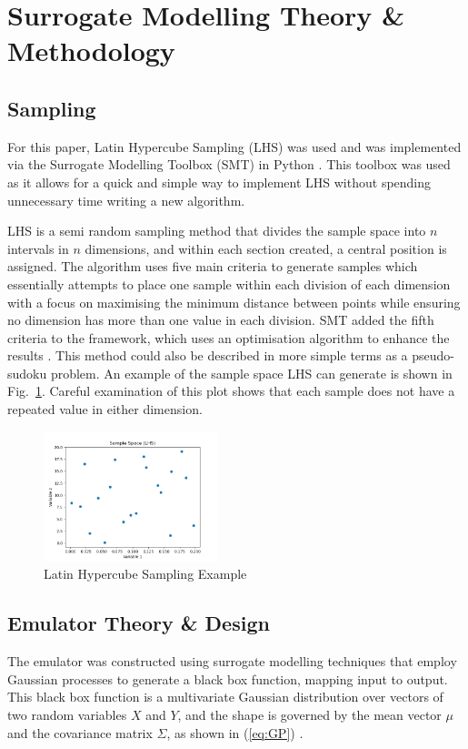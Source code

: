 \documentclass[conference]{IEEEtran}
\begin{document}
\section{Surrogate Modelling Theory \& Methodology}
\subsection{Sampling}

For this paper, Latin Hypercube Sampling (LHS) was used and was implemented via the Surrogate Modelling Toolbox (SMT) in Python \cite{saves_smt_2024}. This toolbox was used as it allows for a quick and simple way to implement LHS without spending unnecessary time writing a new algorithm.

LHS is a semi random sampling method that divides the sample space into $n$ intervals in $n$ dimensions, and within each section created, a central position is assigned. The algorithm uses five main criteria to generate samples which essentially attempts to place one sample within each division of each dimension with a focus on maximising the minimum distance between points while ensuring no dimension has more than one value in each division. SMT added the fifth criteria to the framework, which uses an optimisation algorithm to enhance the results \cite{saves_smt_2024}. This method could also be described in more simple terms as a pseudo-sudoku problem. An example of the sample space LHS can generate is shown in Fig.~\ref{fig:LHS}. Careful examination of this plot shows that each sample does not have a repeated value in either dimension.

\begin{figure}
    \centering
    \includegraphics[width = 0.45\textwidth]{Images/lhs_example_plot.png}
    \caption{Latin Hypercube Sampling Example}
    \label{fig:LHS}
\end{figure}

\subsection{Emulator Theory \& Design}
The emulator was constructed using surrogate modelling techniques that employ Gaussian processes to generate a black box function, mapping input to output. This black box function is a multivariate Gaussian distribution over vectors of two random variables $X$ and $Y$, and the shape is governed by the mean vector $\mu$ and the covariance matrix $\Sigma$, as shown in (\ref{eq:GP}) \cite{gortler_visual_2019} . 
\end{document}
